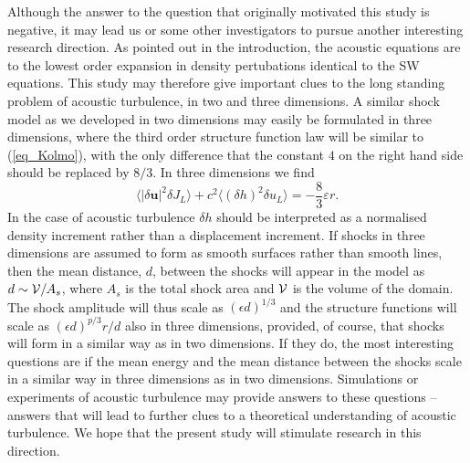 \documentclass{jfm}
\newcommand{\uu}{\textbf{u}}
\newcommand{\meane}[1]{\langle #1 \rangle}
\begin{document}
Although the answer to the question that originally motivated this study is negative, it may lead us or some other investigators to pursue another interesting research direction. As pointed out in the introduction, the acoustic equations are to the lowest order expansion in density pertubations identical to the SW equations. This study may therefore give important clues to the long standing problem of acoustic turbulence, in two and three dimensions. A similar shock model as we developed in two dimensions may easily be formulated in three dimensions, where the third order structure function law will be  similar to (\ref{eq_Kolmo}), with the only difference that the constant $ 4 $ on the right hand side should be replaced by $ 8/3 $. In three dimensions we find
\begin{equation}
\meane{ |\delta \uu|^2 \delta J_L } 
+ c^2\meane{ (\delta h)^2 \delta u_L } = - \frac{8}{3} \varepsilon r. \label{eq_Kolmo3}
\end{equation}
 In the case of acoustic turbulence $ \delta h $ should  be interpreted as a normalised density increment rather than a displacement increment.  If shocks in  three dimensions are assumed to form as  smooth surfaces rather than smooth lines, then the mean distance, $ d $, between the shocks will appear in the model as $ d \sim {\cal{V}}/A_s $, where $ A_{s} $ is the total  shock area and $ \cal{V} $ is the volume of the domain. The shock amplitude will thus scale as $ (\epsilon d)^{1/3} $ and the structure functions will scale as $ (\epsilon d)^{p/3} r/d $ also in three dimensions, provided, of course, that shocks will form in a similar way as in two dimensions. If they do, the most interesting questions are if the mean energy and the mean distance between the shocks scale in a similar way in three dimensions as in two dimensions. Simulations or experiments of acoustic turbulence may provide answers to these questions -- answers that will lead to further clues to a theoretical understanding of acoustic turbulence. 
 We hope that the present study will stimulate research in this direction.  
 



%





\end{document}

